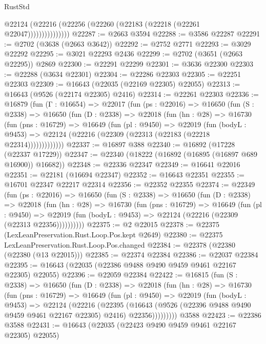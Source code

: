 \begin{lexlean}{RustStd}
\begin{coremodule}
                    @22124 (@22216 (@22256 (@22260 (@22183 (@22218 (@22261 @22047)))))))))))))))
@22287 := @2663 @3594
@22288 := @3586 @22287
@22291 := @2702 (@3638 (@2663 @3642))
@22292 := @2752 @2771
@22293 := @3029 @22292
@22295 := @3021 @22293 @2436
@22299 := @2702 (@3651 (@2663 @22295)) @2869
@22300 := @22291 @22299
@22301 := @3636 @22300
@22303 := @22288 (@3634 @22301)
@22304 := @22286 @22303
@22305 := @22251 @22303
@22309 := @16643 (@22035 (@22169 @22305) @22055)
@22313 := @16643 (@9526 (@22174 @22305) @2416)
@22314 := @22261 @22303
@22336 := @16879
    (fun (Γ : @16654) =>
    @22017
      (fun (ps : @22016) =>
      @16650
        (fun (S : @2338) =>
        @16650
          (fun (D : @2338) =>
          @22018
            (fun (hn : @28) =>
            @16730
              (fun (pns : @16729) =>
              @16649
                (fun (pl : @9450) =>
                @22019
                  (fun (bodyL : @9453) =>
                  @22124 (@22216 (@22309 (@22313 (@22183 (@22218 @22314)))))))))))))
@22337 := @16897 @388
@22340 := @16892 (@17228 (@22337 @17229))
@22347 := @22340 (@18222 (@16892 (@16895 (@16897 @689 @16900)) @16682))
@22348 := @22336 @22347
@22349 := @16641 @22016
@22351 := @22181 (@16694 @22347)
@22352 := @16643 @22351
@22355 := @16701 @22347 @22217 @22314
@22356 := @22352 @22355
@22374 := @22349
    (fun (ps : @22016) =>
    @16650
      (fun (S : @2338) =>
      @16650
        (fun (D : @2338) =>
        @22018
          (fun (hn : @28) =>
          @16730
            (fun (pns : @16729) =>
            @16649
              (fun (pl : @9450) =>
              @22019 (fun (bodyL : @9453) => @22124 (@22216 (@22309 (@22313 @22356))))))))))
@22375 := @2 @22015
@22378 := @22375 (LexLeanPreservation.Rust.Loop.Pos.kept @2649)
@22380 := @22375 LexLeanPreservation.Rust.Loop.Pos.changed
@22384 := @22378 (@22380 (@22380 (@13 @22015)))
@22385 := @22374 @22384
@22386 := @22037 @22384
@22395 := @16643 (@22035 (@22386 @9488 @9490 @9459 @9461 @22167 @22305) @22055)
@22396 := @22059 @22384
@22422 := @16815
    (fun (S : @2338) =>
    @16650
      (fun (D : @2338) =>
      @22018
        (fun (hn : @28) =>
        @16730
          (fun (pns : @16729) =>
          @16649
            (fun (pl : @9450) =>
            @22019
              (fun (bodyL : @9453) =>
              @22124
                (@22216
                  (@22395
                    (@16643
                      (@9526 (@22396 @9488 @9490 @9459 @9461 @22167 @22305) @2416)
                      @22356)))))))))
    @3588
@22423 := @22386 @3588
@22431 := @16643 (@22035 (@22423 @9490 @9459 @9461 @22167 @22305) @22055)

\end{coremodule}
\end{lexlean}
